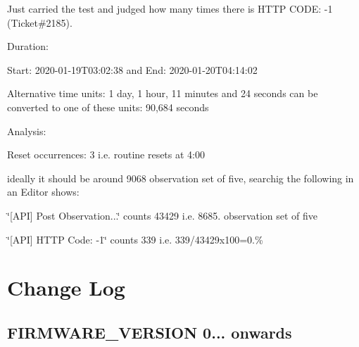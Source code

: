 \begin{DoxyEnumerate}
\begin{DoxyItemize}
\begin{DoxyEnumerate}
\end{DoxyEnumerate}
\end{DoxyItemize}
\item Just carried the test and judged how many times there is H\+T\+TP C\+O\+DE\+: -\/1 (Ticket\#2185).
\begin{DoxyItemize}
\item Duration\+:
\begin{DoxyItemize}
\item Start\+: 2020-\/01-\/19T03\+:02\+:38 and End\+: 2020-\/01-\/20T04\+:14\+:02
\item Alternative time units\+: 1 day, 1 hour, 11 minutes and 24 seconds can be converted to one of these units\+: 90,684 seconds
\end{DoxyItemize}
\item Analysis\+:
\begin{DoxyItemize}
\item Reset occurrences\+: 3 i.\+e. routine resets at 4\+:00
\item ideally it should be around 9068 observation set of five, searchig the following in an Editor shows\+:
\begin{DoxyEnumerate}
\item \char`\"{}\mbox{[}\+A\+P\+I\mbox{]} Post Observation...\char`\"{} counts 43429 i.\+e. 8685. observation set of five
\item \char`\"{}\mbox{[}\+A\+P\+I\mbox{]} H\+T\+T\+P Code\+: -\/1\char`\"{} counts 339 i.\+e. 339/43429x100=0.\%
\end{DoxyEnumerate}
\end{DoxyItemize}
\end{DoxyItemize}
\end{DoxyEnumerate}\hypertarget{index_changelog}{}\section{Change Log}\label{index_changelog}
\hypertarget{index_changelog2}{}\subsection{F\+I\+R\+M\+W\+A\+R\+E\+\_\+\+V\+E\+R\+S\+I\+O\+N 0... onwards}\label{index_changelog2}

